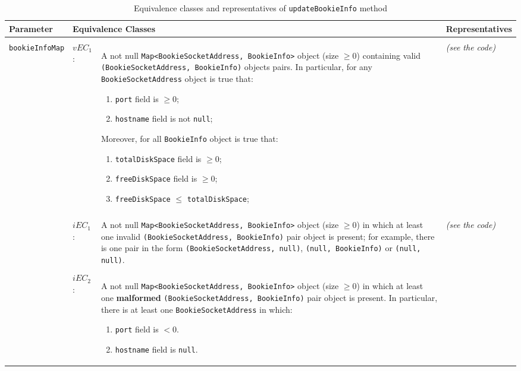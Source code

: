 \documentclass[sigconf]{acmart}
\newcommand{\AndreaTable}[3]{\begin{table*}[h!]
\caption{#1}
\centering
\begin{tabular}{#2}
\toprule
#3
\bottomrule
\end{tabular}
\end{table*}
}
\newcommand{\equivalenceClassesTable}[2]{
\AndreaTable{#1}{llm{8cm}m{8cm}}{#2}
}
\begin{document}
\equivalenceClassesTable{Equivalence classes and representatives of \texttt{updateBookieInfo} method}{
  
    \textbf{Parameter} & \multicolumn{2}{|l|}{\textbf{Equivalence Classes}} & \textbf{Representatives} \\
    \midrule
    
    \\
	\multirow{25}{*}{\texttt{bookieInfoMap}} & $vEC_1$: & A not null \texttt{Map<BookieSocketAddress, BookieInfo>} object (size $\geqslant 0$) containing valid \texttt{(BookieSocketAddress, BookieInfo)} objects pairs. \newline In particular, for any \texttt{BookieSocketAddress} object is true that:
	
	\begin{enumerate}
    \item \texttt{port} field is $ \geqslant 0$;
    \item \texttt{hostname} field is not \texttt{null};
    \end{enumerate}
    
    Moreover, for all \texttt{BookieInfo} object is true that:
    
    \begin{enumerate}
    \item \texttt{totalDiskSpace} field is $ \geqslant 0$;
    \item \texttt{freeDiskSpace} field is $ \geqslant 0$;
    \item \texttt{freeDiskSpace} $\leqslant$ \texttt{totalDiskSpace};
    \end{enumerate}
	
	& \textit{(see the code)} \\    
    
    \\
    & $iEC_1$: & A not null \texttt{Map<BookieSocketAddress, BookieInfo>} object (size $\geqslant 0$) in which at least one invalid \texttt{(BookieSocketAddress, BookieInfo)} pair object is present; for example, there is one pair in the form \texttt{(BookieSocketAddress, null)}, \texttt{(null, BookieInfo)} or \texttt{(null, null)}. & \textit{(see the code)} \\    
    
   \\
    & $iEC_2$: & A not null \texttt{Map<BookieSocketAddress, BookieInfo>} object (size $\geqslant 0$) in which at least one \textbf{malformed} \texttt{(BookieSocketAddress, BookieInfo)} pair object is present. \newline In particular, there is at least one \texttt{BookieSocketAddress} in which:
    \begin{enumerate}
    \item \texttt{port} field is $ < 0$.
    \item \texttt{hostname} field is \texttt{null}.
    \end{enumerate}
    
}
\end{document}
